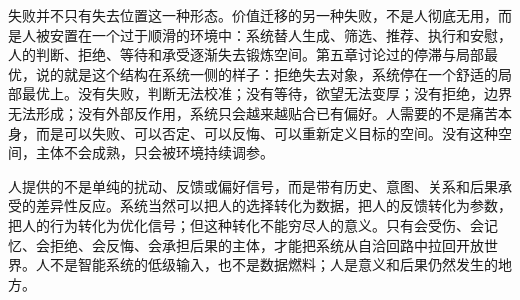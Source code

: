 失败并不只有失去位置这一种形态。价值迁移的另一种失败，不是人彻底无用，而是人被安置在一个过于顺滑的环境中：系统替人生成、筛选、推荐、执行和安慰，人的判断、拒绝、等待和承受逐渐失去锻炼空间。第五章讨论过的停滞与局部最优，说的就是这个结构在系统一侧的样子：拒绝失去对象，系统停在一个舒适的局部最优上。没有失败，判断无法校准；没有等待，欲望无法变厚；没有拒绝，边界无法形成；没有外部反作用，系统只会越来越贴合已有偏好。人需要的不是痛苦本身，而是可以失败、可以否定、可以反悔、可以重新定义目标的空间。没有这种空间，主体不会成熟，只会被环境持续调参。

人提供的不是单纯的扰动、反馈或偏好信号，而是带有历史、意图、关系和后果承受的差异性反应。系统当然可以把人的选择转化为数据，把人的反馈转化为参数，把人的行为转化为优化信号；但这种转化不能穷尽人的意义。只有会受伤、会记忆、会拒绝、会反悔、会承担后果的主体，才能把系统从自洽回路中拉回开放世界。人不是智能系统的低级输入，也不是数据燃料；人是意义和后果仍然发生的地方。

